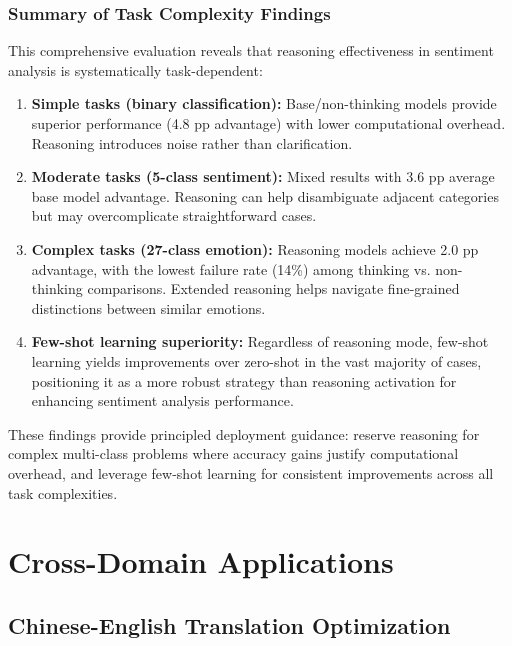 \subsubsection{Summary of Task Complexity Findings}

This comprehensive evaluation reveals that reasoning effectiveness in sentiment analysis is systematically task-dependent:

\begin{enumerate}[leftmargin=*]
    \item \textbf{Simple tasks (binary classification):} Base/non-thinking models provide superior performance (4.8 pp advantage) with lower computational overhead. Reasoning introduces noise rather than clarification.
    
    \item \textbf{Moderate tasks (5-class sentiment):} Mixed results with 3.6 pp average base model advantage. Reasoning can help disambiguate adjacent categories but may overcomplicate straightforward cases.
    
    \item \textbf{Complex tasks (27-class emotion):} Reasoning models achieve 2.0 pp advantage, with the lowest failure rate (14\%) among thinking vs. non-thinking comparisons. Extended reasoning helps navigate fine-grained distinctions between similar emotions.
    
    \item \textbf{Few-shot learning superiority:} Regardless of reasoning mode, few-shot learning yields improvements over zero-shot in the vast majority of cases, positioning it as a more robust strategy than reasoning activation for enhancing sentiment analysis performance.
\end{enumerate}

These findings provide principled deployment guidance: reserve reasoning for complex multi-class problems where accuracy gains justify computational overhead, and leverage few-shot learning for consistent improvements across all task complexities.

\section{Cross-Domain Applications}
\label{sec:cross_domain}

\subsection{Chinese-English Translation Optimization}
\label{subsec:translation}

